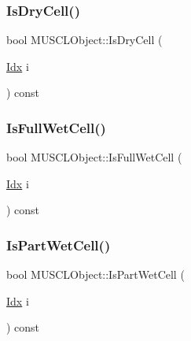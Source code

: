 \mbox{\label{structMUSCLObject_af28aa29d618bb7a6f18786979e073985}} 
\subsubsection{\texorpdfstring{Is\+Dry\+Cell()}{IsDryCell()}}
{\footnotesize\ttfamily bool M\+U\+S\+C\+L\+Object\+::\+Is\+Dry\+Cell (\begin{DoxyParamCaption}\item[{\hyperlink{Includes_8h_ae78891cd308078a2f5f9e7193065c805}{Idx}}]{i }\end{DoxyParamCaption}) const}

\mbox{\label{structMUSCLObject_ab5ab3fb897dba03533436f88267be94e}} 
\subsubsection{\texorpdfstring{Is\+Full\+Wet\+Cell()}{IsFullWetCell()}}
{\footnotesize\ttfamily bool M\+U\+S\+C\+L\+Object\+::\+Is\+Full\+Wet\+Cell (\begin{DoxyParamCaption}\item[{\hyperlink{Includes_8h_ae78891cd308078a2f5f9e7193065c805}{Idx}}]{i }\end{DoxyParamCaption}) const}

\mbox{\label{structMUSCLObject_a13ae627633d480bdfded994053dad157}} 
\subsubsection{\texorpdfstring{Is\+Part\+Wet\+Cell()}{IsPartWetCell()}}
{\footnotesize\ttfamily bool M\+U\+S\+C\+L\+Object\+::\+Is\+Part\+Wet\+Cell (\begin{DoxyParamCaption}\item[{\hyperlink{Includes_8h_ae78891cd308078a2f5f9e7193065c805}{Idx}}]{i }\end{DoxyParamCaption}) const}

